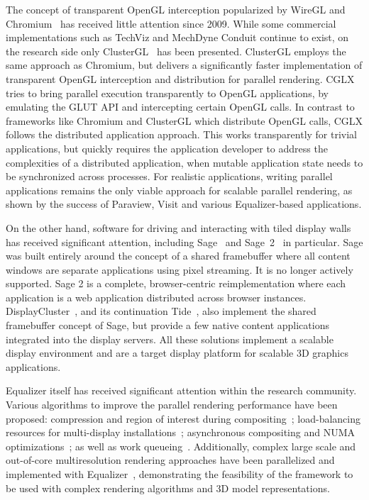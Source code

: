 \documentclass[10pt,journal,compsoc]{IEEEtran}
\begin{document}
The concept of transparent OpenGL interception popularized by \textsf{WireGL}
and \textsf{Chromium}~\cite{HHNFAKK:02} has received little attention since
2009. While some commercial implementations such as \textsf{TechViz} and
\textsf{MechDyne Conduit} continue to exist, on the research side only
\textsf{ClusterGL}~\cite{NHM:11} has been presented. \textsf{ClusterGL} employs
the same approach as \textsf{Chromium}, but delivers a significantly faster
implementation of transparent OpenGL interception and distribution for parallel
rendering. \textsf{CGLX}~\cite{DK:11} tries to bring parallel execution
transparently to OpenGL applications, by emulating the GLUT API and intercepting
certain OpenGL calls. In contrast to frameworks like \textsf{Chromium} and
\textsf{ClusterGL} which distribute OpenGL calls, \textsf{CGLX} follows the
distributed application approach. This works transparently for trivial
applications, but quickly requires the application developer to address the
complexities of a distributed application, when mutable application state needs
to be synchronized across processes. For realistic applications, writing
parallel applications remains the only viable approach for scalable parallel
rendering, as shown by the success of \textsf{Paraview}, \textsf{Visit} and
various \textsf{Equalizer}-based applications.

On the other hand, software for driving and interacting with tiled display walls
has received significant attention, including \textsf{Sage}~\cite{Sage} and
\textsf{Sage~2}~\cite{Sage2} in particular. \textsf{Sage} was built entirely
around the concept of a shared framebuffer where all content windows are
separate applications using pixel streaming. It is no longer actively supported.
\textsf{Sage 2} is a complete, browser-centric reimplementation where each
application is a web application distributed across browser instances.
\textsf{DisplayCluster}~\cite{DC}, and its continuation
\textsf{Tide}~\cite{tide}, also implement the shared framebuffer concept of
\textsf{Sage}, but provide a few native content applications integrated into the
display servers. All these solutions implement a scalable display environment and
are a target display platform for scalable 3D graphics applications.

\textsf{Equalizer} itself has received significant attention within the research
community. Various algorithms to improve the parallel rendering performance have
been proposed: compression and region of interest during
compositing~\cite{MEP:10}; load-balancing resources for multi-display
installations~\cite{EEP:11}; asynchronous compositing and NUMA
optimizations~\cite{EBAHMP:12}; as well as work queueing~\cite{SPEP:16}.
Additionally, complex large scale and out-of-core multiresolution
rendering approaches have been parallelized and implemented with
Equalizer~\cite{GMBP:10, GEMPG:13}, demonstrating the feasibility of
the framework to be used with complex rendering algorithms and 3D model
representations.
\end{document}
